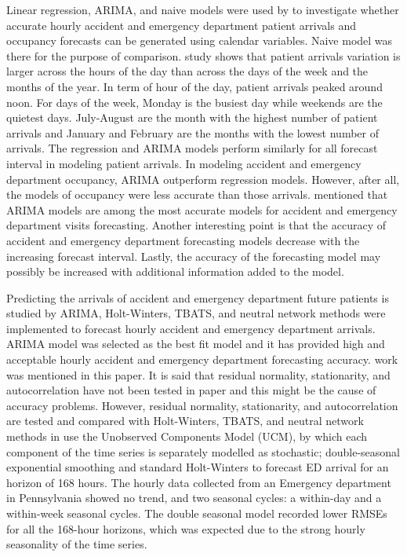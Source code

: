 \documentclass[]{elsarticle} %
\begin{document}
Linear regression, ARIMA, and naive models were used by \citet{hertzum2017forecasting} to investigate whether accurate hourly accident and emergency department patient arrivals and occupancy forecasts can be generated using calendar variables. Naive model was there for the purpose of comparison. \citet{hertzum2017forecasting} study shows that patient arrivals variation is larger across the hours of the day than across the days of the week and the months of the year. In term of hour of the day, patient arrivals peaked around noon. For days of the week, Monday is the busiest day while weekends are the quietest days. July-August are the month with the highest number of patient arrivals and January and February are the months with the lowest number of arrivals. The regression and ARIMA models perform similarly for all forecast interval in modeling patient arrivals. In modeling accident and emergency department occupancy, ARIMA outperform regression models. However, after all, the models of occupancy were less accurate than those arrivals. \citet{hertzum2017forecasting} mentioned that ARIMA models are among the most accurate models for accident and emergency department visits forecasting. Another interesting point is that the accuracy of accident and emergency department forecasting models decrease with the increasing forecast interval. Lastly, the accuracy of the forecasting model may possibly be increased with additional information added to the model.

Predicting the arrivals of accident and emergency department future patients is studied by \citet{choudhury2020forecasting} ARIMA, Holt-Winters, TBATS, and neutral network methods were implemented to forecast hourly accident and emergency department arrivals. ARIMA model was selected as the best fit model and it has provided high and acceptable hourly accident and emergency department forecasting accuracy. \citet{hertzum2017forecasting} work was mentioned in this paper. It is said that residual normality, stationarity, and autocorrelation have not been tested in \citet{hertzum2017forecasting} paper and this might be the cause of accuracy problems. However, residual normality, stationarity, and autocorrelation are tested and compared with Holt-Winters, TBATS, and neutral network methods in \citet{choudhury2020forecasting}
\citet{morzuch2006forecasting} use the Unobserved Components Model (UCM), by which each component of the time series is separately modelled as stochastic; double-seasonal exponential smoothing and standard Holt-Winters to forecast ED arrival for an horizon of 168 hours. The hourly data collected from an Emergency department in Pennsylvania showed no trend, and two seasonal cycles: a within-day and a within-week seasonal cycles. The double seasonal model recorded lower RMSEs for all the 168-hour horizons, which was expected due to the strong hourly seasonality of the time series.
\end{document}
